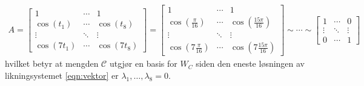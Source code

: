 \documentclass[12pt,
               a4paper,
               article,
               oneside,
               oldfontcommands,
               norsk]{memoir}
\begin{document}
\begin{align*}
A = \begin{bmatrix}
1 &\cdots & 1\\[4pt]
\cos(t_{1}) &\cdots & \cos(t_{8}) \\[4pt]
\vdots &\ddots &\vdots \\[4pt]
\cos(7t_{1}) &\cdots & \cos(7t_{8})
\end{bmatrix} = \begin{bmatrix}
1 &\cdots & 1\\[4pt]
\cos(\frac{\pi}{16}) &\cdots & \cos(\frac{15\pi}{16}) \\[4pt]
\vdots &\ddots &\vdots \\[4pt]
\cos(7\frac{\pi}{16}) &\cdots & \cos(7\frac{15\pi}{16})
\end{bmatrix} \sim \cdots \sim
\begin{bmatrix}
1  &\cdots & 0 \\[4pt]
\vdots &\ddots &\vdots \\[4pt]
0 &\cdots & 1 
\end{bmatrix}
\end{align*}
hvilket betyr at mengden $\mathcal{C}$ utgjør en basis for $W_{C}$ siden den eneste løsningen av likningsystemet \eqref{eqn:vektor} er $\lambda_{1}, \ldots, \lambda_{8} = 0$.
\end{document}
